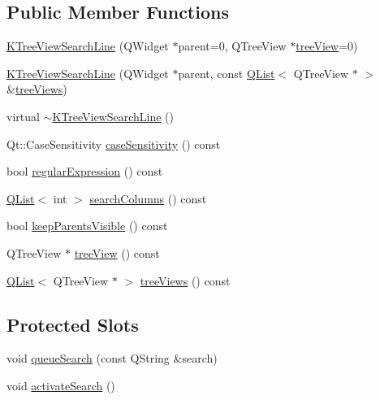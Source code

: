 \subsection*{Public Member Functions}
\begin{DoxyCompactItemize}
\item 
\hyperlink{classKTreeViewSearchLine_a52555313b7e29b386982eafa34a7668d}{K\+Tree\+View\+Search\+Line} (Q\+Widget $\ast$parent=0, Q\+Tree\+View $\ast$\hyperlink{classKTreeViewSearchLine_aeeec1dac59277de847c59fbad49d53b6}{tree\+View}=0)
\item 
\hyperlink{classKTreeViewSearchLine_affbeea1f6b2347c6f8437ca2e650c5a7}{K\+Tree\+View\+Search\+Line} (Q\+Widget $\ast$parent, const \hyperlink{classQList}{Q\+List}$<$ Q\+Tree\+View $\ast$ $>$ \&\hyperlink{classKTreeViewSearchLine_a0f522902ce6754fd223f7ce1814a2a94}{tree\+Views})
\item 
virtual \hyperlink{classKTreeViewSearchLine_a910e3a86fe735396ed94769ce38c5a02}{$\sim$\+K\+Tree\+View\+Search\+Line} ()
\item 
Qt\+::\+Case\+Sensitivity \hyperlink{classKTreeViewSearchLine_ac71c42af94b282cc2ec6ea34dde396e7}{case\+Sensitivity} () const 
\item 
bool \hyperlink{classKTreeViewSearchLine_a3a275ebab6667bfe8652918794ec415e}{regular\+Expression} () const 
\item 
\hyperlink{classQList}{Q\+List}$<$ int $>$ \hyperlink{classKTreeViewSearchLine_af89acb03898864f73c6c1f84fe7c2af5}{search\+Columns} () const 
\item 
bool \hyperlink{classKTreeViewSearchLine_a0977f573dcb6455d3fd5e3e289394f50}{keep\+Parents\+Visible} () const 
\item 
Q\+Tree\+View $\ast$ \hyperlink{classKTreeViewSearchLine_aeeec1dac59277de847c59fbad49d53b6}{tree\+View} () const 
\item 
\hyperlink{classQList}{Q\+List}$<$ Q\+Tree\+View $\ast$ $>$ \hyperlink{classKTreeViewSearchLine_a0f522902ce6754fd223f7ce1814a2a94}{tree\+Views} () const 
\end{DoxyCompactItemize}
\subsection*{Protected Slots}
\begin{DoxyCompactItemize}
\item 
void \hyperlink{classKTreeViewSearchLine_ac5b16cea6e18087ed94e29a3abde9416}{queue\+Search} (const Q\+String \&search)
\item 
void \hyperlink{classKTreeViewSearchLine_ae5c751d7a5ba907f8222acca97ac0925}{activate\+Search} ()
\end{DoxyCompactItemize}
